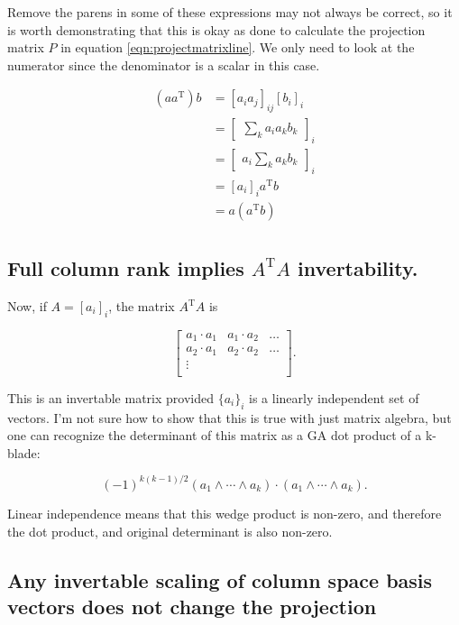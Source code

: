 \documentclass{article}      %
\DeclareMathOperator{\TextTranspose}{T}
\newcommand{\transpose}[1]{{{#1}^{\TextTranspose}}}
\begin{document}
Remove the parens in some of these expressions may not always be correct, so it is worth demonstrating that this is okay as
done to calculate the projection matrix $P$ in 
equation \ref{eqn:projectmatrixline}.
We only need to look at the numerator since the denominator is a scalar in this case.

\begin{align*}
(a \transpose{a}) b
&= [ a_i a_j ]_{ij} [b_i]_i \\
&= 
{\begin{bmatrix}
\sum_k a_i a_k b_k
\end{bmatrix}
}_i \\
&= 
{\begin{bmatrix}
a_i \sum_k a_k b_k
\end{bmatrix}
}_i \\
&= [ a_i ]_i \transpose{a} b \\
&= a (\transpose{a} b) \\
\end{align*}

\subsection{ Full column rank implies $\transpose{A}A$ invertability. }

Now, if $A = [a_i]_i$, 
the matrix $\transpose{A}A$ is

\[
\begin{bmatrix}
{a_1} \cdot {a_1} & {a_1} \cdot {a_2} & \hdots \\
{a_2} \cdot {a_1} & {a_2} \cdot {a_2} & \hdots \\
\vdots & & \\
\end{bmatrix}.
\]

This is an invertable matrix provided $\{a_i\}_i$ is a linearly independent set of vectors.
I'm not sure how to show that this is true with just matrix algebra, but one can recognize the determinant of this matrix as a GA dot product of a k-blade:

\[
(-1)^{k(k-1)/2} (a_1 \wedge \cdots \wedge a_k) \cdot (a_1 \wedge \cdots \wedge a_k).
\]

Linear independence means that this wedge product is non-zero, and therefore the dot product, and original determinant is also non-zero.

\subsection{ Any invertable scaling of column space basis vectors does not change the projection }
\end{document}
